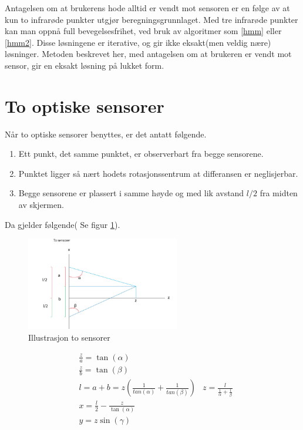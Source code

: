 \documentclass{report}
\begin{document}
Antagelsen om at brukerens hode alltid er vendt mot sensoren er en følge av at kun to infrarøde punkter
utgjør beregningsgrunnlaget. Med tre infrarøde punkter kan man oppnå full bevegelsesfrihet, ved bruk
av algoritmer som \ref{hmm} eller \ref{hmm2}. Disse løsningene er iterative, og gir ikke eksakt(men veldig nære) løsninger.
Metoden beskrevet her, med antagelsen om at brukeren er vendt mot sensor, gir en eksakt løsning på lukket form.

\section{To optiske sensorer}

Når to optiske sensorer benyttes, er det antatt følgende.
\begin{enumerate}
\item Ett punkt, det samme punktet, er observerbart fra begge sensorene. 
\item Punktet ligger så nært hodets rotasjonssentrum at differansen er neglisjerbar.
\item Begge sensorene er plassert i samme høyde og med lik avstand $l/2$ fra midten av skjermen.
\end{enumerate}

Da gjelder følgende( Se figur \ref{fig:Figur_to_sensorer}).
	\begin{figure}[h]
	\centering
	\includegraphics[width=0.60\textwidth]{graphics/Figur_2_sensorer.jpg}
	\caption{Illustrasjon to sensorer}
	\label{fig:Figur_to_sensorer}
	\end{figure}
\begin{eqnarray}\label{definition2}
&\frac{z}{a} = \tan( \alpha )\\
&\frac{z}{b} = \tan( \beta )\\
&l = a + b = z(\frac{1}{tan( \alpha )} + \frac{1}{tan( \beta )})
&z = \frac{l}{\frac{1}{\alpha} + \frac{1}{\beta}}\\
&x = \frac{l}{2} - \frac{z}{\tan( \alpha )}\\
&y = z\sin( \gamma )
\end{eqnarray}
\end{document}
